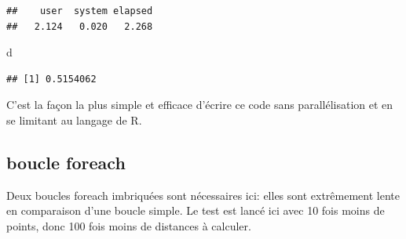 \documentclass[
  12pt,
  french,
  a4paper,
  extrafontsizes,onecolumn,openright
  ]{memoir}
\newenvironment{Shaded}{\begin{snugshade}}{\end{snugshade}}
\newcommand{\ControlFlowTok}[1]{\textcolor[rgb]{0.13,0.29,0.53}{\textbf{#1}}}
\newcommand{\DataTypeTok}[1]{\textcolor[rgb]{0.13,0.29,0.53}{#1}}
\newcommand{\DecValTok}[1]{\textcolor[rgb]{0.00,0.00,0.81}{#1}}
\newcommand{\KeywordTok}[1]{\textcolor[rgb]{0.13,0.29,0.53}{\textbf{#1}}}
\newcommand{\NormalTok}[1]{#1}
\newcommand{\OperatorTok}[1]{\textcolor[rgb]{0.81,0.36,0.00}{\textbf{#1}}}
\newcommand{\StringTok}[1]{\textcolor[rgb]{0.31,0.60,0.02}{#1}}
\begin{document}
\begin{verbatim}
##    user  system elapsed 
##   2.124   0.020   2.268
\end{verbatim}

\begin{Shaded}
\begin{Highlighting}[]
\NormalTok{d}
\end{Highlighting}
\end{Shaded}

\begin{verbatim}
## [1] 0.5154062
\end{verbatim}

\normalsize
C'est la façon la plus simple et efficace d'écrire ce code sans parallélisation et en se limitant au langage de R.

\hypertarget{boucle-foreach}{%
\subsection{boucle foreach}\label{boucle-foreach}}

Deux boucles foreach imbriquées sont nécessaires ici: elles sont extrêmement lente en comparaison d'une boucle simple.
Le test est lancé ici avec 10 fois moins de points, donc 100 fois moins de distances à calculer.

\scriptsize

\begin{Shaded}
\end{Shaded}
\end{document}
